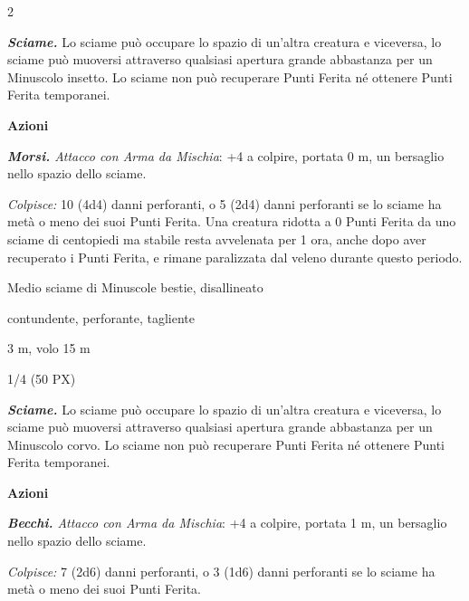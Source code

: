 \begin{multicols}{2}
{\emph{\textbf{Sciame.}} Lo sciame può occupare lo spazio di un'altra creatura e viceversa, lo sciame può muoversi attraverso qualsiasi apertura grande abbastanza per un Minuscolo insetto. Lo sciame non può recuperare Punti Ferita né ottenere Punti Ferita temporanei.

\textbf{Azioni}

\emph{\textbf{Morsi.} Attacco con Arma da Mischia}: +4 a colpire, portata 0 m, un bersaglio nello spazio dello sciame.

\emph{Colpisce:} 10 (4d4) danni perforanti, o 5 (2d4) danni perforanti se lo sciame ha metà o meno dei suoi Punti Ferita. Una creatura ridotta a 0 Punti Ferita da uno sciame di centopiedi ma stabile resta avvelenata per 1 ora, anche dopo aver recuperato i Punti Ferita, e rimane paralizzata dal veleno durante questo periodo.

\begin{description}[noitemsep, topsep=0pt, parsep=0pt, partopsep=0pt, itemsep=1pt, leftmargin=2.35cm,  labelwidth=2.2cm, itemindent=0cm, listparindent=0pt] %
\setlength{\baselineskip}{10pt}
\item[\textbf{Taglia/Tipo}] Medio sciame di Minuscole bestie, disallineato
\item[\textbf{Caratt.}] 
\item[\textbf{Punti Ferita}] 
\item[\textbf{Resistenze al danno}] contundente, perforante, tagliente
\item[\textbf{Tiri Salvez.}] 
\item[\textbf{Movimento}] 3 m, volo 15 m
\item[\textbf{Sfida}] 1/4 (50 PX)
\end{description}
\smallskip

\emph{\textbf{Sciame.}} Lo sciame può occupare lo spazio di un'altra creatura e viceversa, lo sciame può muoversi attraverso qualsiasi apertura grande abbastanza per un Minuscolo corvo. Lo sciame non può recuperare Punti Ferita né ottenere Punti Ferita temporanei.

\textbf{Azioni}

\emph{\textbf{Becchi.} Attacco con Arma da Mischia}: +4 a colpire, portata 1 m, un bersaglio nello spazio dello sciame.

\emph{Colpisce:} 7 (2d6) danni perforanti, o 3 (1d6) danni perforanti se lo sciame ha metà o meno dei suoi Punti Ferita.

}
\end{multicols}
